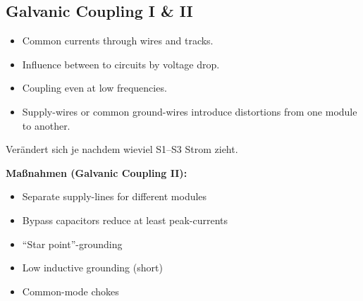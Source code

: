 \documentclass[11pt,a4paper]{article}
\begin{document}
\subsection{Galvanic Coupling I \& II}
\begin{itemize}
    \item Common currents through wires and tracks.
    \item Influence between to circuits by voltage drop.
    \item Coupling even at low frequencies.
    \item Supply-wires or common ground-wires introduce distortions from one module to another.
\end{itemize}
Verändert sich je nachdem wieviel S1--S3 Strom zieht.

\textbf{Maßnahmen (Galvanic Coupling II):}
\begin{itemize}
    \item Separate supply-lines for different modules
    \item Bypass capacitors reduce at least peak-currents
    \item ``Star point''-grounding
    \item Low inductive grounding (short)
    \item Common-mode chokes
\end{itemize}
\end{document}
